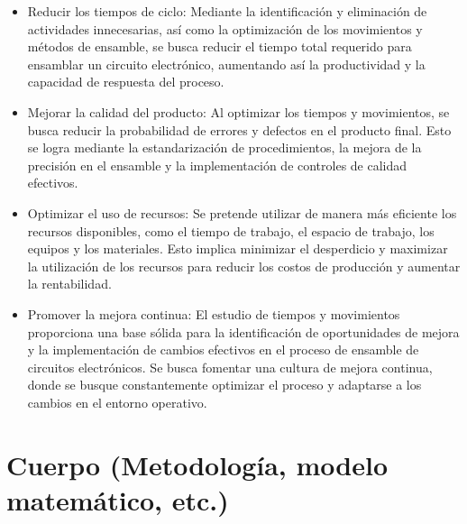     \begin{itemize}
        \item Reducir los tiempos de ciclo: Mediante la identificación y eliminación de actividades innecesarias, así como la optimización de los movimientos y métodos de ensamble, se busca reducir el tiempo total requerido para ensamblar un circuito electrónico, aumentando así la productividad y la capacidad de respuesta del proceso.
        \item Mejorar la calidad del producto: Al optimizar los tiempos y movimientos, se busca reducir la probabilidad de errores y defectos en el producto final. Esto se logra mediante la estandarización de procedimientos, la mejora de la precisión en el ensamble y la implementación de controles de calidad efectivos.
        \item Optimizar el uso de recursos: Se pretende utilizar de manera más eficiente los recursos disponibles, como el tiempo de trabajo, el espacio de trabajo, los equipos y los materiales. Esto implica minimizar el desperdicio y maximizar la utilización de los recursos para reducir los costos de producción y aumentar la rentabilidad.
        \item Promover la mejora continua: El estudio de tiempos y movimientos proporciona una base sólida para la identificación de oportunidades de mejora y la implementación de cambios efectivos en el proceso de ensamble de circuitos electrónicos. Se busca fomentar una cultura de mejora continua, donde se busque constantemente optimizar el proceso y adaptarse a los cambios en el entorno operativo. 

    \end{itemize}

    \section{Cuerpo (Metodología, modelo matemático, etc.)}




